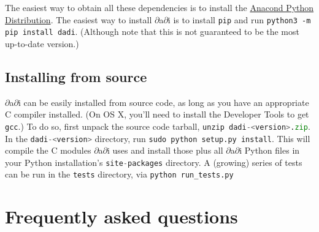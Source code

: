 \documentclass[12pt]{article}
\makeatletter
\newcommand{\dadi}{$\partial$a$\partial$i\xspace}
\newcommand{\py}[1]{\lstinline[language=Python, showstringspaces=False]@#1@}
\makeatother
\begin{document}
The easiest way to obtain all these dependencies is to install the \href{https://www.anaconda.com/distribution/}{Anacond Python Distribution}.
The easiest way to install \dadi is to install \texttt{pip} and run \texttt{python3 -m pip install dadi}.
(Although note that this is not guaranteed to be the most up-to-date version.)

\subsection{Installing from source}

\dadi can be easily installed from source code, as long as you have an appropriate C compiler installed. (On OS X, you'll need to install the Developer Tools to get \py{gcc}.) To do so, first unpack the source code tarball, \py{unzip dadi-<version>.zip}.
In the \py{dadi-<version>} directory, run \py{sudo python setup.py install}.
This will compile the C modules \dadi uses and install those plus all \dadi Python files in your Python installation's \py{site-packages} directory.
A (growing) series of tests can be run in the \py{tests} directory, via \py{python run_tests.py}

\section{Frequently asked questions}
\end{document}
